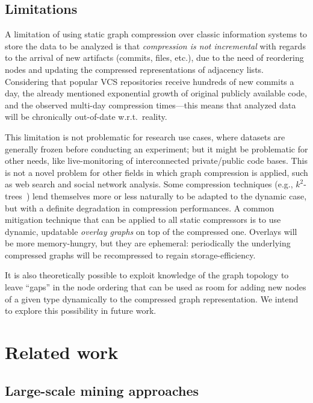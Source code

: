 \subsection{Limitations}

A limitation of using static graph compression over classic information systems
to store the data to be analyzed is that \emph{compression is not incremental}
with regards to the arrival of new artifacts (commits, files, etc.), due to the
need of reordering nodes and updating the compressed representations of
adjacency lists. Considering that popular VCS repositories receive hundreds of
new commits a day, the already mentioned exponential growth of original
publicly available code, and the observed multi-day compression times---this
means that analyzed data will be chronically out-of-date w.r.t.~reality.

This limitation is not problematic for research use cases, where datasets are
generally frozen before conducting an experiment; but it might be problematic
for other needs, like live-monitoring of interconnected private/public code
bases. This is not a novel problem for other fields in which graph compression
is applied, such as web search and social network analysis. Some compression
techniques (e.g., $k^2$-trees~\cite{brisaboa2017compressed}) lend themselves
more or less naturally to be adapted to the dynamic case, but with a definite
degradation in compression performances. A common mitigation technique that can
be applied to all static compressors is to use dynamic, updatable \emph{overlay
  graphs} on top of the compressed one. Overlays will be more memory-hungry,
but they are ephemeral: periodically the underlying compressed graphs will be
recompressed to regain storage-efficiency.

It is also theoretically possible to exploit knowledge of the graph topology to
leave ``gaps'' in the node ordering that can be used as room for adding new
nodes of a given type dynamically to the compressed graph representation. We
intend to explore this possibility in future work.

\section{Related work}%
\label{sec:compression-related}

\subsection{Large-scale mining approaches}

